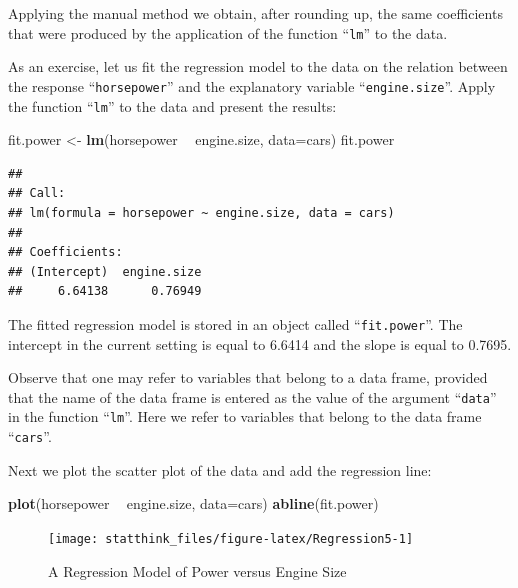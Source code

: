 \documentclass[]{krantz}
\makeatletter
\newenvironment{Shaded}{\begin{snugshade}}{\end{snugshade}}
\newcommand{\DataTypeTok}[1]{\textcolor[rgb]{0.13,0.29,0.53}{#1}}
\newcommand{\KeywordTok}[1]{\textcolor[rgb]{0.13,0.29,0.53}{\textbf{#1}}}
\newcommand{\NormalTok}[1]{#1}
\newcommand{\OperatorTok}[1]{\textcolor[rgb]{0.81,0.36,0.00}{\textbf{#1}}}
\newcommand{\StringTok}[1]{\textcolor[rgb]{0.31,0.60,0.02}{#1}}
\newenvironment{kframe}{%
\medskip{}
\setlength{\fboxsep}{.8em}
 \def\at@end@of@kframe{}%
 \ifinner\ifhmode%
  \def\at@end@of@kframe{\end{minipage}}%
  \begin{minipage}{\columnwidth}%
 \fi\fi%
 \def\FrameCommand##1{\hskip\@totalleftmargin \hskip-\fboxsep
 \colorbox{shadecolor}{##1}\hskip-\fboxsep
     \hskip-\linewidth \hskip-\@totalleftmargin \hskip\columnwidth}%
 \MakeFramed {\advance\hsize-\width
   \@totalleftmargin\z@ \linewidth\hsize
   \@setminipage}}%
 {\par\unskip\endMakeFramed%
 \at@end@of@kframe}
\renewenvironment{Shaded}{\begin{kframe}}{\end{kframe}}
\theoremstyle{definition}
\theoremstyle{definition}
\theoremstyle{definition}
\theoremstyle{remark}
\makeatother
\begin{document}
Applying the manual method we obtain, after rounding up, the same
coefficients that were produced by the application of the function
``\texttt{lm}'' to the data.

As an exercise, let us fit the regression model to the data on the
relation between the response ``\texttt{horsepower}'' and the explanatory
variable ``\texttt{engine.size}''. Apply the function ``\texttt{lm}'' to the data and
present the results:

\begin{Shaded}
\begin{Highlighting}[]
\NormalTok{fit.power <-}\StringTok{ }\KeywordTok{lm}\NormalTok{(horsepower }\OperatorTok{~}\StringTok{ }\NormalTok{engine.size, }\DataTypeTok{data=}\NormalTok{cars)}
\NormalTok{fit.power}
\end{Highlighting}
\end{Shaded}

\begin{verbatim}
## 
## Call:
## lm(formula = horsepower ~ engine.size, data = cars)
## 
## Coefficients:
## (Intercept)  engine.size  
##     6.64138      0.76949
\end{verbatim}

The fitted regression model is stored in an object called ``\texttt{fit.power}''.
The intercept in the current setting is equal to 6.6414 and the slope is
equal to 0.7695.

Observe that one may refer to variables that belong to a data frame,
provided that the name of the data frame is entered as the value of the
argument ``\texttt{data}'' in the function ``\texttt{lm}''. Here we refer to variables
that belong to the data frame ``\texttt{cars}''.

Next we plot the scatter plot of the data and add the regression line:

\begin{Shaded}
\begin{Highlighting}[]
\KeywordTok{plot}\NormalTok{(horsepower }\OperatorTok{~}\StringTok{ }\NormalTok{engine.size, }\DataTypeTok{data=}\NormalTok{cars)}
\KeywordTok{abline}\NormalTok{(fit.power)}
\end{Highlighting}
\end{Shaded}

\begin{figure}

{\centering \texttt{[image: statthink\_files/figure-latex/Regression5-1]} 

}

\caption{A Regression Model of Power versus Engine Size}\label{fig:Regression5}
\end{figure}
\end{document}
